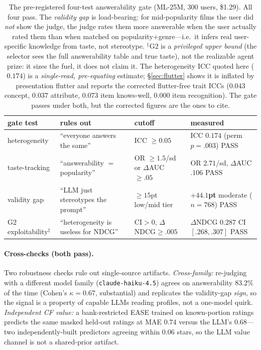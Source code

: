 \documentclass[11pt]{article}
\begin{document}
\begin{table}[h]\centering\small
\begin{tabular}{lll l}
\toprule
gate test & rules out & cutoff & measured\\
\midrule
heterogeneity & ``everyone answers the same'' & ICC $\ge0.05$ & ICC $0.174$ (perm $p{=}.003$) \quad PASS\\
taste-tracking & ``answerability $=$ popularity'' & OR $\ge1.5$/sd or $\Delta$AUC $\ge.05$ & OR $2.71$/sd, $\Delta$AUC $.106$ \quad PASS\\
validity gap & ``LLM just stereotypes the prompt'' & $\ge15$pt low/mid tier & \textbf{$+44.1$pt} moderate ($n{=}768$) \quad PASS\\
G2 exploitability$^\ddagger$ & ``heterogeneity is useless for NDCG'' & CI$>0$, $\Delta$NDCG$\ge.005$ & $\Delta$NDCG $0.287$ CI$[.268,.307]$ \quad PASS\\
\bottomrule
\end{tabular}
\caption{The pre-registered four-test answerability gate (ML-25M, $300$ users, \$1.29). All four pass. The
\emph{validity gap} is load-bearing: for mid-popularity films the user did \emph{not} show the judge, the judge
rates them more answerable when the user actually rated them than when matched on popularity$+$genre---i.e.\ it
infers real user-specific knowledge from taste, not stereotype. $^\ddagger$G2 is a \emph{privileged upper bound}
(the selector sees the full answerability table and true taste), not the realizable agent prize: it sizes the
fuel, it does not claim it. The heterogeneity ICC quoted here ($0.174$) is a \emph{single-read, pre-equating}
estimate; \S\ref{sec:flutter} shows it is inflated by presentation flutter and reports the corrected flutter-free trait
ICCs ($0.043$ concept, $0.037$ attribute, $0.073$ item knows-well, $0.000$ item recognition). The gate passes under
both, but the corrected figures are the ones to cite.}
\label{tab:extgate}
\end{table}

\paragraph{Cross-checks (both pass).} Two robustness checks rule out single-source artifacts. \emph{Cross-family:}
re-judging with a different model family (\texttt{claude-haiku-4.5}) agrees on answerability $83.2\%$ of the time
(Cohen's $\kappa{=}0.67$, substantial) and replicates the validity-gap \emph{sign}, so the signal is a property of
capable LLMs reading profiles, not a one-model quirk. \emph{Independent CF value:} a bank-restricted EASE trained
on known-portion ratings predicts the same masked held-out ratings at MAE $0.74$ versus the LLM's $0.68$---two
independently-built predictors agreeing within $0.06$ stars, so the LLM value channel is not a shared-prior
artifact.
\end{document}
